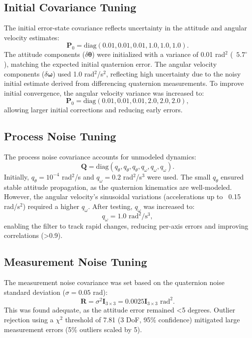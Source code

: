 \documentclass[11pt]{article}
\begin{document}
\subsection{Initial Covariance Tuning}
The initial error-state covariance reflects uncertainty in the attitude and angular velocity estimates:
\[
\mathbf{P}_0 = \text{diag}(0.01, 0.01, 0.01, 1.0, 1.0, 1.0).
\]
The attitude components (\(\delta \boldsymbol{\theta}\)) were initialized with a variance of 0.01 rad\(^2\) (~\(5.7^\circ\)), matching the expected initial quaternion error. The angular velocity components (\(\delta \boldsymbol{\omega}\)) used 1.0 rad\(^2\)/s\(^2\), reflecting high uncertainty due to the noisy initial estimate derived from differencing quaternion measurements. To improve initial convergence, the angular velocity variance was increased to:
\[
\mathbf{P}_0 = \text{diag}(0.01, 0.01, 0.01, 2.0, 2.0, 2.0),
\]
allowing larger initial corrections and reducing early errors.

\subsection{Process Noise Tuning}
The process noise covariance accounts for unmodeled dynamics:
\[
\mathbf{Q} = \text{diag}(q_{\theta}, q_{\theta}, q_{\theta}, q_{\omega}, q_{\omega}, q_{\omega}).
\]
Initially, \(q_{\theta} = 10^{-4}\) rad\(^2\)/s and \(q_{\omega} = 0.2\) rad\(^2\)/s\(^3\) were used. The small \(q_{\theta}\) ensured stable attitude propagation, as the quaternion kinematics are well-modeled. However, the angular velocity’s sinusoidal variations (accelerations up to ~0.15 rad/s\(^2\)) required a higher \(q_{\omega}\). After testing, \(q_{\omega}\) was increased to:
\[
q_{\omega} = 1.0 \text{ rad}^2/\text{s}^3,
\]
enabling the filter to track rapid changes, reducing per-axis errors and improving correlations (>0.9).

\subsection{Measurement Noise Tuning}
The measurement noise covariance was set based on the quaternion noise standard deviation (\(\sigma = 0.05\) rad):
\[
\mathbf{R} = \sigma^2 \mathbf{I}_{3 \times 3} = 0.0025 \mathbf{I}_{3 \times 3} \text{ rad}^2.
\]
This was found adequate, as the attitude error remained <5 degrees. Outlier rejection using a \(\chi^2\) threshold of 7.81 (3 DoF, 95\% confidence) mitigated large measurement errors (5\% outliers scaled by 5).
\end{document}
